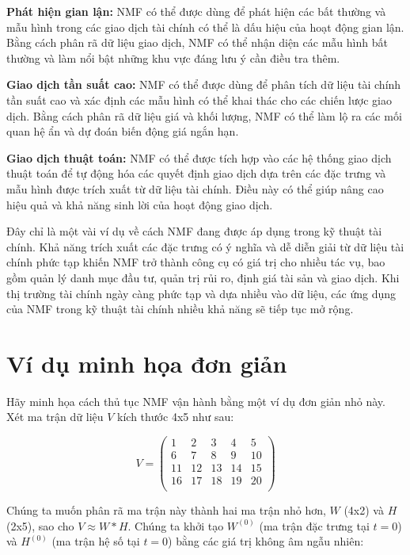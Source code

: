 \textbf{Phát hiện gian lận:} NMF có thể được dùng để phát hiện các bất thường và mẫu hình trong các giao dịch tài chính có thể là dấu hiệu của hoạt động gian lận. Bằng cách phân rã dữ liệu giao dịch, NMF có thể nhận diện các mẫu hình bất thường và làm nổi bật những khu vực đáng lưu ý cần điều tra thêm.

\textbf{Giao dịch tần suất cao:} NMF có thể được dùng để phân tích dữ liệu tài chính tần suất cao và xác định các mẫu hình có thể khai thác cho các chiến lược giao dịch. Bằng cách phân rã dữ liệu giá và khối lượng, NMF có thể làm lộ ra các mối quan hệ ẩn và dự đoán biến động giá ngắn hạn.

\textbf{Giao dịch thuật toán:} NMF có thể được tích hợp vào các hệ thống giao dịch thuật toán để tự động hóa các quyết định giao dịch dựa trên các đặc trưng và mẫu hình được trích xuất từ dữ liệu tài chính. Điều này có thể giúp nâng cao hiệu quả và khả năng sinh lời của hoạt động giao dịch.

Đây chỉ là một vài ví dụ về cách NMF đang được áp dụng trong kỹ thuật tài chính. Khả năng trích xuất các đặc trưng có ý nghĩa và dễ diễn giải từ dữ liệu tài chính phức tạp khiến NMF trở thành công cụ có giá trị cho nhiều tác vụ, bao gồm quản lý danh mục đầu tư, quản trị rủi ro, định giá tài sản và giao dịch. Khi thị trường tài chính ngày càng phức tạp và dựa nhiều vào dữ liệu, các ứng dụng của NMF trong kỹ thuật tài chính nhiều khả năng sẽ tiếp tục mở rộng.

\section{Ví dụ minh họa đơn giản}

Hãy minh họa cách thủ tục NMF vận hành bằng một ví dụ đơn giản nhỏ này. Xét ma trận dữ liệu \(V\) kích thước 4x5 như sau:

\[V = \begin{pmatrix} 1 & 2 & 3 & 4 & 5 \\ 6 & 7 & 8 & 9 & 10 \\ 11 & 12 & 13 & 14 & 15 \\ 16 & 17 & 18 & 19 & 20 \\ \end{pmatrix}\]

Chúng ta muốn phân rã ma trận này thành hai ma trận nhỏ hơn, \(W\) (4x2) và \(H\) (2x5), sao cho \(V \ensuremath{\approx} W * H\). Chúng ta khởi tạo \(W^{(0)}\) (ma trận đặc trưng tại \(t=0\)) và \(H^{(0)}\) (ma trận hệ số tại \(t=0\)) bằng các giá trị không âm ngẫu nhiên:

